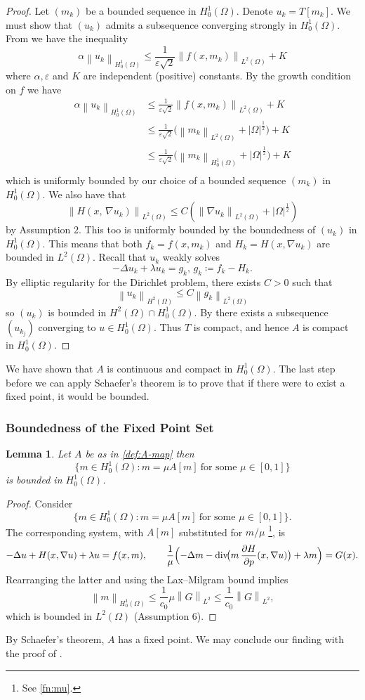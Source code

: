 \documentclass[11pt]{article}
\numberwithin{equation}{section}
\newtheorem{lemma}[lemma]{Lemma}
\theoremstyle{definition}
\theoremstyle{remark}
\DeclareMathOperator{\diver}{div}
\newcommand{\Ltwo}{L^2(\Omega)}
\newcommand{\Honez}{H_0^1(\Omega)}
\newcommand{\Hp}{\frac{\partial H}{\partial p}}
\newcommand{\norm}[1]{\left\lVert #1 \right\rVert}
\begin{document}
\begin{proof}
  Let $(m_k)$ be a bounded sequence in $\Honez$.
  Denote $u_k = T[m_k]$. We must show that $(u_k)$ admits a subsequence converging strongly in $\Honez$. 
  From  we have the inequality
  \[\alpha \norm{u_k}_{\Honez} \le \frac{1}{\varepsilon\sqrt{2}} \norm{f(x,m_k)}_{\Ltwo}+ K\]
  where $\alpha, \varepsilon$ and $K$ are independent (positive) constants. 
  By the growth condition on $f$ we have
  \begin{align*}
    \alpha \norm{u_k}_{\Honez}
    &\le \frac{1}{\varepsilon \sqrt{2}} \norm{f(x,m_k)}_{\Ltwo}+ K\\
    &\le \frac{1}{\varepsilon \sqrt{2}} \bigl(\norm{m_k}_{\Ltwo} + |\Omega|^\frac12\bigr)+ K\\
    &\le \frac{1}{\varepsilon \sqrt{2}} \bigl(\norm{m_k}_{\Honez} + |\Omega|^\frac12\bigr)+ K\\
  \end{align*}
  which is uniformly bounded by our choice of a bounded sequence $(m_k)$ in $\Honez$.
  We also have that 
  \[\norm{H(x,\,\nabla u_k)}_{\Ltwo} \le C(\norm{\nabla u_k}_{\Ltwo} + |\Omega|^\frac12)\] by Assumption 2. This too is uniformly bounded by the boundedness of $(u_k)$ in $\Honez$. This means that both $f_k =f(x,m_k)$
  and $H_k = H(x,\nabla u_k)$ are bounded in $\Ltwo$.
  Recall that $u_k$ weakly solves 
  \[-\Delta u_k +\lambda u_k = g_k,\, g_k \coloneqq f_k - H_k.\]
  By elliptic regularity for the Dirichlet problem, there exists $C>0$ such that 
  \[\norm{u_k}_{H^2(\Omega)} \le C\norm{g_k}_{\Ltwo}\] 
  so $(u_k)$ is bounded in $H^2(\Omega) \cap \Honez$. By  there exists a subsequence $(u_{k_j})$ converging to $u \in \Honez$. 
  Thus $T$ is compact, and hence $A$ is compact in $\Honez$.
\end{proof}

We have shown that $A$ is continuous and compact in $\Honez$. The last step before we can apply Schaefer's theorem is to prove 
that if there were to exist a fixed point, it would be bounded. 

\subsubsection{Boundedness of the Fixed Point Set}
\begin{lemma}
  \label{thm:A-bounded}
  Let $A$ be as in \cref{def:A-map} then 
  \[\{m\in\Honez: m=\mu A[m]\ \text{for some }\mu\in[0,1]\}\]
  is bounded in $\Honez$.
\end{lemma}
\begin{proof}Consider
\[\{m\in\Honez: m=\mu A[m]\ \text{for some }\mu\in[0,1]\}.\]
The corresponding system, with $A[m]$ substituted for $m/\mu$ \footnote{See \ref{fn:mu}.}, is
\[-\Delta u + H(x,\nabla u) + \lambda u = f(x,m), \qquad \frac{1}{\mu}\Bigl(-\Delta m - \diver\!\bigl(m\,\Hp(x,\nabla u)\bigr) + \lambda m\Bigr)=G(x).\]
Rearranging the latter and using the Lax--Milgram bound implies
\[\norm{m}_{\Honez}\le \frac{1}{c_0}\mu \norm{G}_{L^2}\le \frac{1}{c_0}\norm{G}_{L^2},\]
which is bounded in $\Ltwo$ (Assumption 6). 
\end{proof}
By Schaefer's theorem, $A$ has a fixed point. We may conclude our finding with the proof of .
\end{document}
